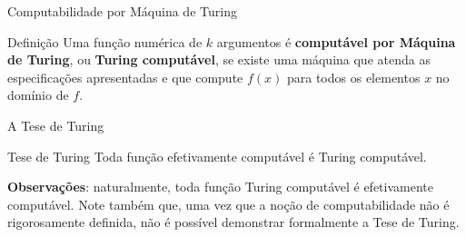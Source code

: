 \begin{frame}[fragile]{Computabilidade por Máquina de Turing}

    \begin{block}{Definição}
        Uma função numérica de $k$ argumentos é \textbf{computável por Máquina de Turing}, ou
        \textbf{Turing computável}, se existe uma máquina que atenda as especificações 
        apresentadas e que compute $f(x)$ para todos os elementos $x$ no domínio de $f$.
    \end{block}

\end{frame}

\begin{frame}[fragile]{A Tese de Turing}

    \begin{block}{Tese de Turing}
        Toda função efetivamente computável é Turing computável.
    \end{block}

    \vspace{0.2in}

    \textbf{Observações}: naturalmente, toda função Turing computável é efetivamente computável.
    Note também que, uma vez que a noção de computabilidade não é rigorosamente definida, não é
    possível demonstrar formalmente a Tese de Turing.
\end{frame}
